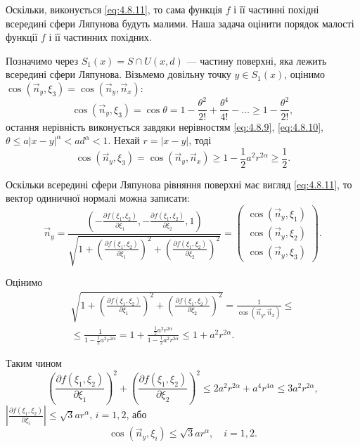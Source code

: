 Оскільки, виконується \eqref{eq:4.8.11}, то сама функція $f$ і її частинні похідні всередині сфери Ляпунова будуть малими. Наша задача оцінити порядок малості функції $f$ і її частинних похідних. \medskip

Позначимо через $S_1(x) = S \cap U(x, d)$ --- частину поверхні, яка лежить всередині сфери Ляпунова. Візьмемо довільну точку $y \in S_1(x)$, оцінимо $\cos(\vec n_y, \xi_3) = \cos(\vec n_y, \vec n_x)$:
\begin{equation}
	\cos(\vec n_y, \xi_3) = \cos \theta = 1 - \frac{\theta^2}{2!} + \frac{\theta^4}{4!} - \ldots \ge 1 - \frac{\theta^2}{2!},
\end{equation}
остання нерівність виконується завдяки нерівностям \eqref{eq:4.8.9}, \eqref{eq:4.8.10}, $\theta \le a |x - y|^\alpha < a d^\alpha < 1$. Нехай $r = |x - y|$, тоді
\begin{equation}
	\label{eq:4.8.47}
	\cos(\vec n_y, \xi_3) = \cos(\vec n_y, \vec n_x) \ge 1 - \frac12 a^2 r^{2\alpha} \ge \frac12.
\end{equation}

Оскільки всередині сфери Ляпунова рівняння поверхні має вигляд \eqref{eq:4.8.11}, то вектор одиничної нормалі можна записати:
\begin{equation}
	\label{eq:4.8.14}
	\vec n_y = \frac{\left(-\frac{\partial f(\xi_1, \xi_2)}{\partial \xi_1}, -\frac{\partial f(\xi_1, \xi_2)}{\partial \xi_2}, 1\right)}{\sqrt{1 + \left(\frac{\partial f(\xi_1, \xi_2)}{\partial \xi_1}\right)^2 + \left(\frac{\partial f(\xi_1, \xi_2)}{\partial \xi_2}\right)^2}} = \begin{pmatrix} \cos(\vec n_y, \xi_1) \\ \cos(\vec n_y, \xi_2) \\ \cos(\vec n_y, \xi_3) \end{pmatrix}.
\end{equation}

Оцінимо
\begin{multline}
	\sqrt{1 + \left(\frac{\partial f(\xi_1, \xi_2)}{\partial \xi_1}\right)^2 + \left(\frac{\partial f(\xi_1, \xi_2)}{\partial \xi_2}\right)^2} = \frac{1}{\cos(\vec n_y, \vec n_x)} \le \\
	\le \frac{1}{1 - \frac12 a^2 r^{2 \alpha}} = 1 + \frac{\frac12 a^2 r^{2 \alpha}}{1 - \frac12 a^2 r^{2 \alpha}} \le 1 + a^2 r^{2 \alpha}.
\end{multline}

Таким чином 
\begin{equation}
	\left(\frac{\partial f(\xi_1, \xi_2)}{\partial \xi_1}\right)^2 + \left(\frac{\partial f(\xi_1, \xi_2)}{\partial \xi_2}\right)^2 \le 2a^2 r^{2\alpha} + a^4 r^{4\alpha} \le 3a^2 r^{2\alpha},
\end{equation}
$\left|\frac{\partial f(\xi_1, \xi_2)}{\partial \xi_i}\right| \le \sqrt{3} a r^\alpha$, $i = 1, 2$, або
\begin{equation}
	\label{eq:4.8.15}
	\cos(\vec n_y, \xi_i) \le \sqrt{3} a r^{\alpha}, \quad i = 1, 2.
\end{equation}

